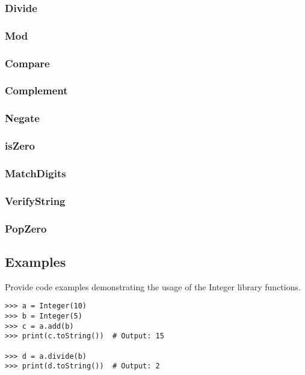 \subsubsection{Divide}
\subsubsection{Mod}
\subsubsection{Compare}
\subsubsection{Complement}
\subsubsection{Negate}
\subsubsection{isZero}
\subsubsection{MatchDigits}
\subsubsection{VerifyString}
\subsubsection{PopZero}


\subsection{Examples}

Provide code examples demonstrating the usage of the Integer library functions. 

\begin{verbatim}
>>> a = Integer(10)
>>> b = Integer(5)
>>> c = a.add(b)
>>> print(c.toString())  # Output: 15

>>> d = a.divide(b)
>>> print(d.toString())  # Output: 2
\end{verbatim}